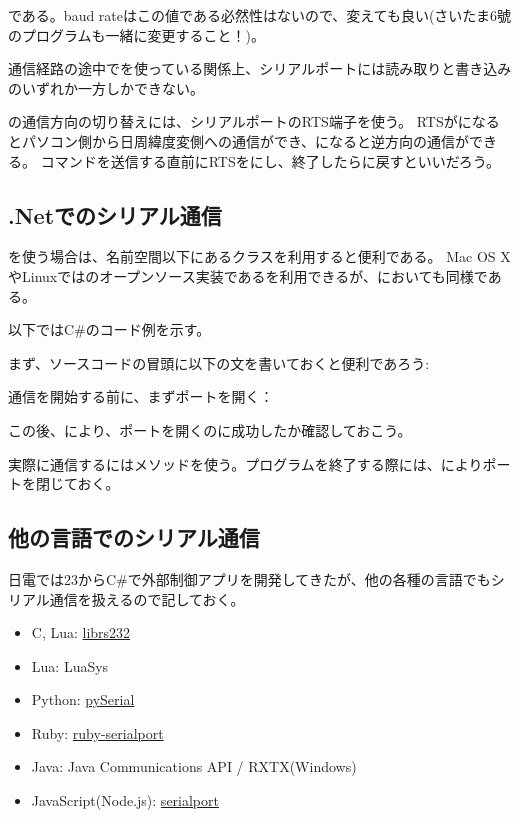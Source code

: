 \documentclass[letterpaper,10pt,dvipdfmx]{sphinxmanual}
\begin{document}
である。baud
rateはこの値である必然性はないので、変えても良い(さいたま6號のプログラムも一緒に変更すること！)。

通信経路の途中でを使っている関係上、シリアルポートには読み取りと書き込みのいずれか一方しかできない。

の通信方向の切り替えには、シリアルポートのRTS端子を使う。
RTSがになるとパソコン側から日周緯度変側への通信ができ、になると逆方向の通信ができる。
コマンドを送信する直前にRTSをにし、終了したらに戻すといいだろう。


\subsection{.Netでのシリアル通信}
\label{\detokenize{nissyu-idohen/pc-software:net}}
を使う場合は、名前空間以下にあるクラスを利用すると便利である。
Mac OS
XやLinuxではのオープンソース実装であるを利用できるが、においても同様である。

以下ではC\#のコード例を示す。

まず、ソースコードの冒頭に以下の文を書いておくと便利であろう:

通信を開始する前に、まずポートを開く：

この後、により、ポートを開くのに成功したか確認しておこう。

実際に通信するにはメソッドを使う。プログラムを終了する際には、によりポートを閉じておく。


\subsection{他の言語でのシリアル通信}
\label{\detokenize{nissyu-idohen/pc-software:id7}}
日電では23からC\#で外部制御アプリを開発してきたが、他の各種の言語でもシリアル通信を扱えるので記しておく。
\begin{itemize}
\item {} 
C, Lua: \href{https://github.com/ynezz/librs232/}{librs232}

\item {} 
Lua: LuaSys

\item {} 
Python: \href{http://pyserial.sourceforge.net/}{pySerial}

\item {} 
Ruby: \href{http://ruby-serialport.rubyforge.org/}{ruby-serialport}

\item {} 
Java: Java Communications API / RXTX(Windows)

\item {} 
JavaScript(Node.js):
\href{https://www.npmjs.com/package/serialport}{serialport}

\end{itemize}
\end{document}
